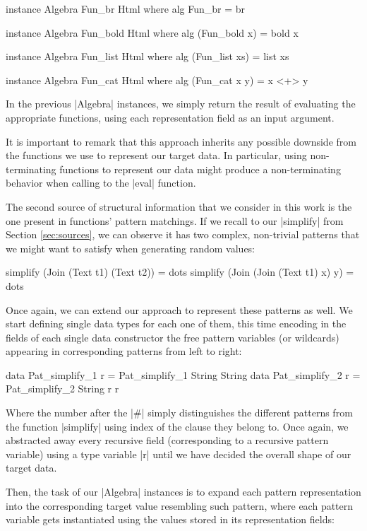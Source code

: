 \begin{code}
instance Algebra Fun_br Html where
  alg Fun_br = br

instance Algebra Fun_bold Html where
  alg (Fun_bold x) = bold x

instance Algebra Fun_list Html where
  alg (Fun_list xs) = list xs

instance Algebra Fun_cat Html where
  alg (Fun_cat x y) = x <+> y
\end{code}
%
In the previous |Algebra| instances, we simply return the result of evaluating
the appropriate functions, using each representation field as an input argument.


It is important to remark that this approach inherits any possible downside from
the functions we use to represent our target data.
%
In particular, using non-terminating functions to represent our data might
produce a non-terminating behavior when calling to the |eval| function.


%
%
The second source of structural information that we consider in this work is the
one present in functions' pattern matchings.
%
If we recall to our |simplify| from Section \ref{sec:sources}, we can observe it
has two complex, non-trivial patterns that we might want to satisfy when
generating random values:

\begin{code}
simplify (Join (Text t1) (Text t2))   = dots
simplify (Join (Join (Text t1) x) y)  = dots
\end{code}

Once again, we can extend our approach to represent these patterns as well.
%
We start defining single data types for each one of them, this time encoding in
the fields of each single data constructor the free pattern variables (or
wildcards) appearing in corresponding patterns from left to right:

\begin{code}
data Pat_simplify_1 r = Pat_simplify_1 String String
data Pat_simplify_2 r = Pat_simplify_2 String r r
\end{code}
%
Where the number after the |#| simply distinguishes the different patterns from
the function |simplify| using index of the clause they belong to.
%
Once again, we abstracted away every recursive field (corresponding to a
recursive pattern variable) using a type variable |r| until we have decided the
overall shape of our target data.


Then, the task of our |Algebra| instances is to expand each pattern
representation into the corresponding target value resembling such pattern,
where each pattern variable gets instantiated using the values stored in its
representation fields:

